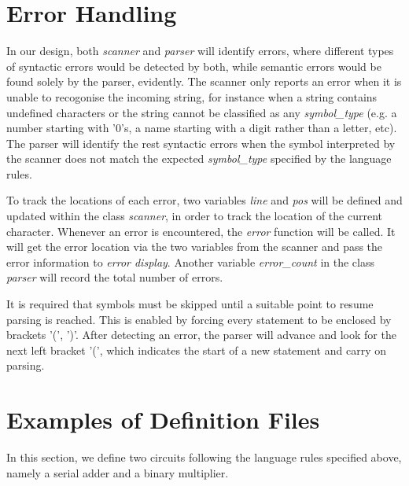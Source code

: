 \documentclass[12pt]{article}
\def\n{\noindent}
\begin{document}
\section{Error Handling}
\n In our design, both \textit{scanner} and \textit{parser} will identify errors, where different types of syntactic errors would be detected by both, while semantic errors would be found solely by the parser, evidently. The scanner only reports an error when it is unable to recogonise the incoming string, for instance when a string contains undefined characters or the string cannot be classified as any \emph{symbol\_type} (e.g. a number starting with '0's, a name starting with a digit rather than a letter, etc). The parser will identify the rest syntactic errors when the symbol interpreted by the scanner does not match the expected \emph{symbol\_type} specified by the language rules.


\vspace{0.3cm}

\n To track the locations of each error, two variables \textit{line} and \textit{pos} will be defined and updated within the class \textit{scanner}, in order to track the location of the current character. Whenever an error is encountered, the \textit{error} function will be called. It will get the error location via the two variables from the scanner and pass the error information to \textit{error display}. Another variable \emph{error\_count} in the class \textit{parser} will record the total number of errors.


\vspace{0.3cm}

\n It is required that symbols must be skipped until a suitable point to resume
parsing is reached. This is enabled by forcing every statement to be enclosed by
brackets '(', ')'. After detecting an error, the parser will advance and look
for the next left bracket '(', which indicates the start of a new statement and
carry on parsing.

\section{Examples of Definition Files}
In this section, we define two circuits following the language rules specified above, namely a serial adder and a binary multiplier.
\end{document}
